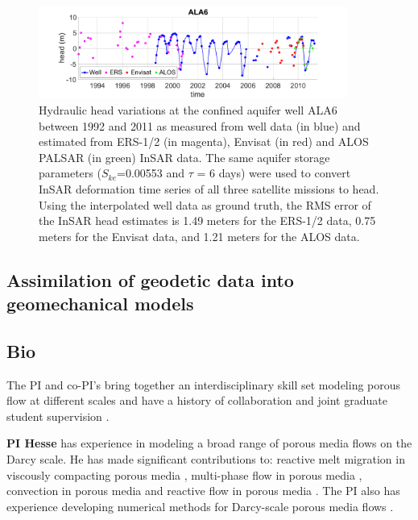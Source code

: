 \documentclass[11pt,final]{article}%
\begin{document}
\begin{figure}
\noindent\includegraphics[width=0.9\textwidth]{Figures/ALA6.pdf}
\caption{Hydraulic head variations at the confined aquifer well ALA6 between 1992 and 2011 as measured from well data (in blue) and estimated from ERS-1/2 (in magenta), Envisat (in red) and ALOS PALSAR (in green) InSAR data. The same aquifer storage parameters ($S_{ke}$=0.00553 and $\tau$ = 6 days) were used to convert InSAR deformation time series of all three satellite missions to head. Using the interpolated well data as ground truth, the RMS error of the InSAR head estimates is 1.49 meters for the ERS-1/2 data, 0.75 meters for the Envisat data, and 1.21 meters for the ALOS data.}
\label{fig:ALA6}
\end{figure}

\subsection{Assimilation of geodetic data into geomechanical models}


\subsection{Bio}
The PI and co-PI's bring together an interdisciplinary skill set modeling porous flow at different scales and have a history of collaboration and joint graduate student supervision \cite{Ghanbarzadeh2014,Ghanbarzadeh2015a,Ghanbarzadeh2015b,Ghanbarzadeh2017}.

\textbf{PI Hesse} has experience in modeling a broad range of porous media flows on the Darcy scale. He has made significant contributions to: reactive melt migration in viscously compacting porous media \cite{Hesse2003,Liang2010a,Liang2011b,Hesse2011,Schiemenz2011,Jordan2015,Arbogast2017,Jordan2018}, multi-phase flow in porous media \cite{Hesse2007,Hesse2008,Hesse2010,Golding2011,Sathaye2016b}, convection in porous media \cite{Riaz2006,Neufeld2010,MacMinn2012,Szulczewski2013a,Sathaye2014,Woods2015} and reactive flow in porous media \cite{Prigiobbe2012a,Prigiobbe2012b,Prigiobbe2013,Venkatraman2014,McNeece2016}. The PI also has experience developing numerical methods for Darcy-scale porous media flows \cite{Li2005,Hesse2008b,Schiemenz2011,Hesse2012,Hesse2014,Arbogast2017}.
\end{document}
